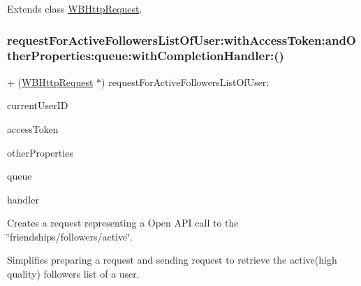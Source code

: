 Extends class \mbox{\hyperlink{interface_w_b_http_request_a158110b5d079d1ddd7baae029a8a36fb}{W\+B\+Http\+Request}}.

\mbox{\label{category_w_b_http_request_07_weibo_user_08_a158110b5d079d1ddd7baae029a8a36fb}} 
\subsubsection{\texorpdfstring{request\+For\+Active\+Followers\+List\+Of\+User\+:with\+Access\+Token\+:and\+Other\+Properties\+:queue\+:with\+Completion\+Handler\+:()}{requestForActiveFollowersListOfUser:withAccessToken:andOtherProperties:queue:withCompletionHandler:()}\hspace{0.1cm}{\footnotesize\ttfamily [2/3]}}
{\footnotesize\ttfamily + (\mbox{\hyperlink{interface_w_b_http_request}{W\+B\+Http\+Request}} $\ast$) request\+For\+Active\+Followers\+List\+Of\+User\+: \begin{DoxyParamCaption}\item[{(N\+S\+String $\ast$)}]{current\+User\+ID }\item[{withAccessToken:(N\+S\+String $\ast$)}]{access\+Token }\item[{andOtherProperties:(N\+S\+Dictionary $\ast$)}]{other\+Properties }\item[{queue:(N\+S\+Operation\+Queue $\ast$)}]{queue }\item[{withCompletionHandler:(W\+B\+Request\+Handler)}]{handler }\end{DoxyParamCaption}}

Creates a request representing a Open A\+PI call to the \char`\"{}friendships/followers/active\char`\"{}.

Simplifies preparing a request and sending request to retrieve the active(high quality) followers list of a user.

